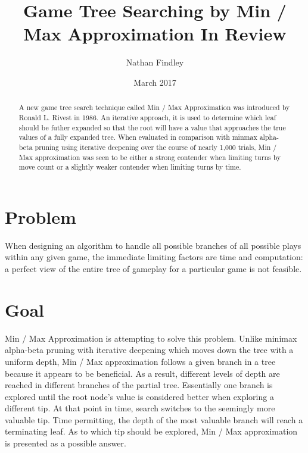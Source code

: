 \documentclass[10pt, a4paper]{article}
\title{Game Tree Searching by Min / Max Approximation In Review}
\author{Nathan Findley}
\date{March 2017}
\begin{document}
\maketitle

\begin{abstract}

A new game\cite{lamport94} tree search technique called Min / Max Approximation was introduced
by Ronald L. Rivest in 1986.  An iterative approach, it is used to determine
which leaf should be futher expanded so that the root will have a value that
approaches the true values of a fully expanded tree.  When evaluated in 
comparison with minmax alpha-beta pruning
using iterative deepening over the course of nearly 1,000 trials, Min / Max
approximation was seen to be either a strong contender when limiting turns by move count 
or a slightly weaker contender when limiting turns by time.

\end{abstract}

\section{Problem} 

When designing an algorithm to handle all possible branches of all possible
plays within any given game, the immediate limiting factors are time and computation: a perfect
view of the entire tree of gameplay for a particular game is not feasible.

\section{Goal} 

Min / Max Approximation is attempting to solve this problem.  Unlike minimax
alpha-beta pruning with iterative deepening which moves down the tree with a uniform depth, 
Min / Max approximation follows a
given branch in a tree because it appears to be beneficial.  As a result, different
levels of depth are reached in different branches of the partial tree.  Essentially one branch is explored
until the root node's value is considered better when exploring a different tip.
At that point in time, search switches to the seemingly more valuable tip.  
Time permitting, the depth of the most valuable branch will reach a terminating leaf.  As to which tip should 
be explored, Min / Max approximation is presented as a possible answer.
\end{document}

